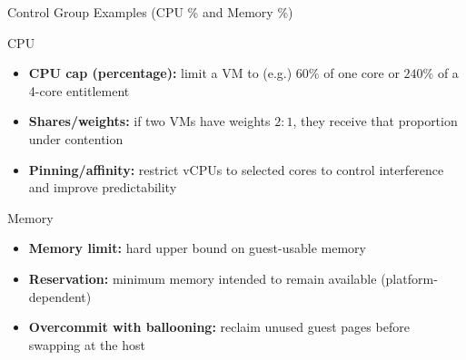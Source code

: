\begin{frame}{Control Group Examples (CPU \% and Memory \%)}
  \begin{block}{CPU}
    \begin{itemize}
      \item \textbf{CPU cap (percentage):} limit a VM to (e.g.) \(60\%\) of one core or \(240\%\) of a 4-core entitlement
      \item \textbf{Shares/weights:} if two VMs have weights \(2{:}1\), they receive that proportion under contention
      \item \textbf{Pinning/affinity:} restrict vCPUs to selected cores to control interference and improve predictability
    \end{itemize}
  \end{block}

  \begin{block}{Memory}
    \begin{itemize}
      \item \textbf{Memory limit:} hard upper bound on guest-usable memory
      \item \textbf{Reservation:} minimum memory intended to remain available (platform-dependent)
      \item \textbf{Overcommit with ballooning:} reclaim unused guest pages before swapping at the host
    \end{itemize}
  \end{block}
\end{frame}


